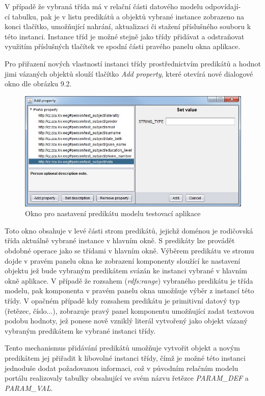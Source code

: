 \documentclass{projekt}
\begin{document}
V případě že vybraná třída má v relační části datového modelu odpovídají-\\cí tabulku, pak je v listu predikátů a objektů vybrané instance zobrazeno na konci tlačítko, umožňující nahrání, aktualizaci či stažení příslušného souboru k této instanci. 
Instance tříd je možné stejně jako třídy přidávat a odstraňovat využitím příslušných tlačítek ve spodní části pravého panelu okna aplikace.


Pro přiřazení nových vlastností instanci třídy prostřednictvím predikátů a hodnot jimi vázaných objektů slouží tlačítko {\it Add property}, které otevírá nové dialogové okno dle obrázku 9.2.


\begin{figure}[htb]
\begin{center}
\includegraphics[scale=0.65]{propertyFrame.jpg}
\caption{Okno pro nastavení predikátu modelu testovací aplikace}
\end{center}
\end{figure}

Toto okno obsahuje v levé části strom predikátů, jejichž doménou je rodičovská třída aktuálně vybrané instance v hlavním okně. S predikáty lze provádět obdobné operace jako se třídami v hlavním okně. Výběrem predikátu ve stromu dojde v pravém panelu okna ke zobrazení komponenty sloužící ke nastavení objektu jež bude vybraným predikátem svázán ke instanci vybrané v hlavním okně aplikace. V případě že rozsahem ({\it rdfs:range}) vybraného predikátu je třída modelu, pak komponenta v pravém panelu okna umožňuje výběr z instancí této třídy. V opačném případě kdy rozsahem predikátu je primitivní datový typ (řetězec, číslo...), zobrazuje pravý panel komponentu umožňující zadat textovou podobu hodnoty, jež ponese nově vzniklý literál vytvořený jako objekt vázaný vybraným predikátem ke vybrané instanci třídy. 

Tento mechanismus přidávání predikátů umožňuje vytvořit objekt a novým predikátem jej přiřadit k libovolné instanci třídy, čímž je možné této instanci jednoduše dodat požadovanou informaci, což v původním relačním modelu portálu realizovaly tabulky obsahující ve svém názvu řetězce {\it PARAM\_DEF} a {\it PARAM\_VAL}.
\end{document}
